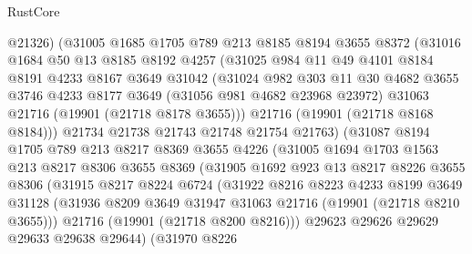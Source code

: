 \begin{lexlean}{RustCore}
\begin{coremodule}
              @21326)
            (@31005
              @1685
              @1705
              @789
              @213
              @8185
              @8194
              @3655
              @8372
              (@31016
                @1684
                @50
                @13
                @8185
                @8192
                @4257
                (@31025
                  @984
                  @11
                  @49
                  @4101
                  @8184
                  @8191
                  @4233
                  @8167
                  @3649
                  @31042
                  (@31024
                    @982
                    @303
                    @11
                    @30
                    @4682
                    @3655
                    @3746
                    @4233
                    @8177
                    @3649
                    (@31056 @981 @4682 @23968 @23972)
                    @31063
                    @21716
                    (@19901 (@21718 @8178 @3655)))
                  @21716
                  (@19901 (@21718 @8168 @8184)))
                @21734
                @21738
                @21743
                @21748
                @21754
                @21763)
              (@31087
                @8194
                @1705
                @789
                @213
                @8217
                @8369
                @3655
                @4226
                (@31005
                  @1694
                  @1703
                  @1563
                  @213
                  @8217
                  @8306
                  @3655
                  @8369
                  (@31905
                    @1692
                    @923
                    @13
                    @8217
                    @8226
                    @3655
                    @8306
                    (@31915
                      @8217
                      @8224
                      @6724
                      (@31922
                        @8216
                        @8223
                        @4233
                        @8199
                        @3649
                        @31128
                        (@31936 @8209 @3649 @31947 @31063 @21716 (@19901 (@21718 @8210 @3655)))
                        @21716
                        (@19901 (@21718 @8200 @8216)))
                      @29623
                      @29626
                      @29629
                      @29633
                      @29638
                      @29644)
                    (@31970
                      @8226

\end{coremodule}
\end{lexlean}
